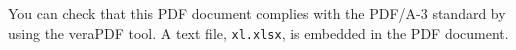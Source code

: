\documentclass{article}
\begin{document}
You can check that this PDF document complies with the PDF/A-3 standard by using the veraPDF tool. A text file, \texttt{xl.xlsx}, is embedded in the PDF document. 

\end{document}
